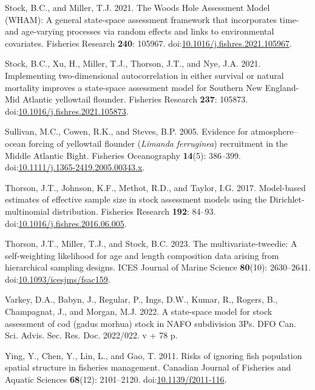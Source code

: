 \documentclass[
]{article}
\newlength{\cslhangindent}
\newlength{\cslentryspacingunit} %
\newenvironment{CSLReferences}[2] %
 {%
  \setlength{\parindent}{0pt}
  \ifodd #1
  \let\oldpar\par
  \def\par{\hangindent=\cslhangindent\oldpar}
  \fi
  \setlength{\parskip}{#2\cslentryspacingunit}
 }%
 {}
\begin{document}
\begin{CSLReferences}{1}{0}
\leavevmode{}%
Stock, B.C., and Miller, T.J. 2021. The {Woods Hole Assessment Model}
({WHAM}): A general state-space assessment framework that incorporates
time- and age-varying processes via random effects and links to
environmental covariates. Fisheries Research \textbf{240}: 105967.
doi:\href{https://doi.org/10.1016/j.fishres.2021.105967}{10.1016/j.fishres.2021.105967}.

\leavevmode{}%
Stock, B.C., Xu, H., Miller, T.J., Thorson, J.T., and Nye, J.A. 2021.
Implementing two-dimensional autocorrelation in either survival or
natural mortality improves a state-space assessment model for {Southern
New England}-{Mid Atlantic} yellowtail flounder. Fisheries Research
\textbf{237}: 105873.
doi:\href{https://doi.org/10.1016/j.fishres.2021.105873}{10.1016/j.fishres.2021.105873}.

\leavevmode{}%
Sullivan, M.C., Cowen, R.K., and Steves, B.P. 2005. Evidence for
atmosphere{--}ocean forcing of yellowtail flounder (\emph{{L}imanda}
\emph{ferruginea}) recruitment in the {M}iddle {A}tlantic {B}ight.
Fisheries Oceanography \textbf{14}(5): 386--399.
doi:\href{https://doi.org/10.1111/j.1365-2419.2005.00343.x}{10.1111/j.1365-2419.2005.00343.x}.

\leavevmode{}%
Thorson, J.T., Johnson, K.F., Methot, R.D., and Taylor, I.G. 2017.
Model-based estimates of effective sample size in stock assessment
models using the {D}irichlet-multinomial distribution. Fisheries
Research \textbf{192}: 84--93.
doi:\href{https://doi.org/10.1016/j.fishres.2016.06.005}{10.1016/j.fishres.2016.06.005}.

\leavevmode{}%
Thorson, J.T., Miller, T.J., and Stock, B.C. 2023. The
multivariate-tweedie: A self-weighting likelihood for age and length
composition data arising from hierarchical sampling designs. ICES
Journal of Marine Science \textbf{80}(10): 2630--2641.
doi:\href{https://doi.org/10.1093/icesjms/fsac159}{10.1093/icesjms/fsac159}.

\leavevmode{}%
Varkey, D.A., Babyn, J., Regular, P., Ings, D.W., Kumar, R., Rogers, B.,
Champagnat, J., and Morgan, M.J. 2022. A state-space model for stock
assessment of cod (gadus morhua) stock in NAFO subdivision 3Ps. {DFO}
{Can.} {Sci.} {Advis.} {Sec.} {Res.} {Doc.} 2022/022. v + 78 p.

\leavevmode{}%
Ying, Y., Chen, Y., Lin, L., and Gao, T. 2011. Risks of ignoring fish
population spatial structure in fisheries management. Canadian Journal
of Fisheries and Aquatic Sciences \textbf{68}(12): 2101--2120.
doi:\href{https://doi.org/10.1139/f2011-116}{10.1139/f2011-116}.

\end{CSLReferences}
\end{document}
